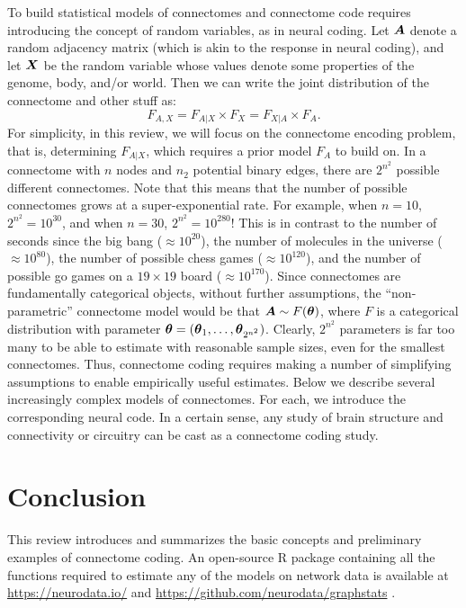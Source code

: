 \documentclass[11pt]{article}
\begin{document}
 To build  statistical models of connectomes and connectome code requires introducing the concept of random variables, as in neural coding.  Let $\boldsymbol{A}$ denote a random adjacency matrix (which is akin to the response in neural coding), and let $\boldsymbol{X}$ be  the random variable whose values denote some properties of the genome, body, and/or world. Then we can write the joint distribution of the connectome and other stuff as:
 \begin{equation}
F_{A,X} = F_{A|X} \times F_X = F_{X| A}\times F_A.
\end{equation}
For simplicity, in this review, we will focus on the connectome encoding problem, that is, determining $F_{A|X}$, which requires a prior  model $F_A$ to build on.  
 In a connectome with $n$ nodes  and  $n_2$ potential binary edges, there are $2^{n^2}$ possible different connectomes.  Note that this means that the number of possible connectomes grows at a super-exponential rate.  For example, when $n=10$, $2^{n^2}=10^{30}$, and when $n=30$, $2^{n^2}=10^{280}$!
 This is in contrast to the number of seconds  since the big bang ($\approx 10^{20}$), the number  of molecules in the universe ($\approx 10^{80}$),   the number of possible chess games ($\approx 10^{120}$), and  the number of possible go games on a $19 \times 19$ board ($\approx 10^{170}$).
 Since connectomes are fundamentally categorical objects, without further assumptions, the ``non-parametric'' connectome model would be that $\boldsymbol{A} \sim F(\boldsymbol{\theta})$, where $F$ is  a categorical distribution with parameter $\boldsymbol{\theta}=(\boldsymbol{\theta}_1,\ldots, \boldsymbol{\theta}_{2^{n^2}})$. Clearly, $2^{n^2}$  parameters is far too many to be able to  estimate with reasonable sample sizes, even for the smallest connectomes.  Thus, connectome coding {requires} making a number of simplifying assumptions to enable empirically  useful estimates.  Below we describe several increasingly complex models of connectomes.   
  For each, we introduce the corresponding neural code.
 In a certain sense, any study of brain structure and connectivity or circuitry can be cast as a connectome coding study.

 



\section{Conclusion}

This review introduces and summarizes the basic concepts and preliminary examples of connectome coding.  An open-source  R package containing all the functions required to estimate any of the models on network data is available at \url{https://neurodata.io/} and  \url{https://github.com/neurodata/graphstats} \cite{Bridgeford2018}.
\end{document}
